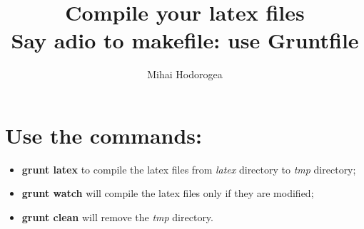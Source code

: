 \documentclass[a4paper]{article}
\author{Mihai Hodorogea}
\title{\textbf{Compile your latex files}\\Say adio to makefile: use \textbf{Gruntfile} }
\begin{document}
\maketitle

\section{Use the commands:}
\begin{itemize}
\item \textbf{grunt latex} to compile the latex files from \emph{latex} directory to \emph{tmp} directory;
\item \textbf{grunt watch} will compile the latex files only if they are modified;
\item \textbf{grunt clean} will remove the \emph{tmp} directory.

\end{itemize}
\end{document}
